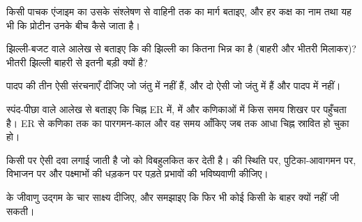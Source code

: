 \begin{exercise}[$\star$]\label{exo:b1:eukaryotic-cell:2}
किसी पाचक एंजाइम का उसके संश्लेषण से वाहिनी तक का मार्ग बताइए, और हर
कक्ष का नाम तथा यह भी कि प्रोटीन उनके बीच कैसे जाता है।
\end{exercise}

\begin{exercise}[$\star$]\label{exo:b1:eukaryotic-cell:3}
झिल्ली-बजट वाले आलेख से बताइए कि  की झिल्ली का कितना भिन्न
 का है (बाहरी और भीतरी मिलाकर)? भीतरी झिल्ली बाहरी से इतनी
बड़ी क्यों है?
\end{exercise}

\begin{exercise}[$\star$]\label{exo:b1:eukaryotic-cell:4}
पादप  की तीन ऐसी संरचनाएँ दीजिए जो जंतु  में नहीं हैं, और दो
ऐसी जो जंतु  में हैं और पादप  में नहीं।
\end{exercise}

\begin{exercise}[$\star\star$]\label{exo:b1:eukaryotic-cell:5}
स्पंद-पीछा वाले आलेख से बताइए कि चिह्न ER में,  में और कणिकाओं में
किस समय शिखर पर पहुँचता है। ER से कणिका तक का पारगमन-काल और वह समय
आँकिए जब तक आधा चिह्न स्रावित हो चुका हो।
\end{exercise}

\begin{exercise}[$\star\star$]\label{exo:b1:eukaryotic-cell:6}
किसी  पर ऐसी दवा लगाई जाती है जो  को विबहुलकित कर
देती है।  की स्थिति पर, पुटिका-आवागमन पर,  विभाजन पर और
पक्ष्माभों की धड़कन पर पड़ते प्रभावों की भविष्यवाणी कीजिए।
\end{exercise}

\begin{exercise}[$\star\star$]\label{exo:b1:eukaryotic-cell:7}
 के जीवाणु उद्गम के चार साक्ष्य दीजिए, और समझाइए कि फिर भी
कोई  किसी  के बाहर क्यों नहीं जी सकती।
\end{exercise}

